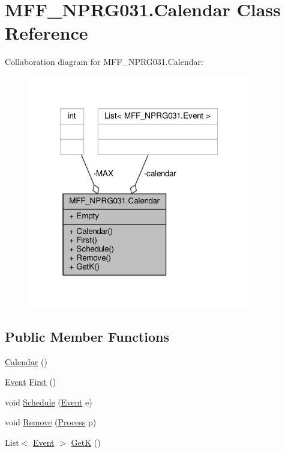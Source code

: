 \hypertarget{classMFF__NPRG031_1_1Calendar}{\section{M\-F\-F\-\_\-\-N\-P\-R\-G031.\-Calendar Class Reference}
\label{classMFF__NPRG031_1_1Calendar}
}


Collaboration diagram for M\-F\-F\-\_\-\-N\-P\-R\-G031.\-Calendar\-:\nopagebreak
\begin{figure}[H]
\begin{center}
\leavevmode
\includegraphics[width=275pt]{classMFF__NPRG031_1_1Calendar__coll__graph}
\end{center}
\end{figure}
\subsection*{Public Member Functions}
\begin{DoxyCompactItemize}
\item 
\hyperlink{classMFF__NPRG031_1_1Calendar_a2279253074472fa30255b2637df30a46}{Calendar} ()
\item 
\hyperlink{classMFF__NPRG031_1_1Event}{Event} \hyperlink{classMFF__NPRG031_1_1Calendar_a623642e4db01cef075845ef5c7db5e0f}{First} ()
\item 
void \hyperlink{classMFF__NPRG031_1_1Calendar_a59c90e97093d8ed21f1c6d36f2a88918}{Schedule} (\hyperlink{classMFF__NPRG031_1_1Event}{Event} e)
\item 
void \hyperlink{classMFF__NPRG031_1_1Calendar_a02ce42eb2c88d16ac1b6296bd9ce7062}{Remove} (\hyperlink{classMFF__NPRG031_1_1Process}{Process} p)
\item 
List$<$ \hyperlink{classMFF__NPRG031_1_1Event}{Event} $>$ \hyperlink{classMFF__NPRG031_1_1Calendar_ab50fb8b653b95205910e61d079ae0676}{Get\-K} ()
\end{DoxyCompactItemize}
